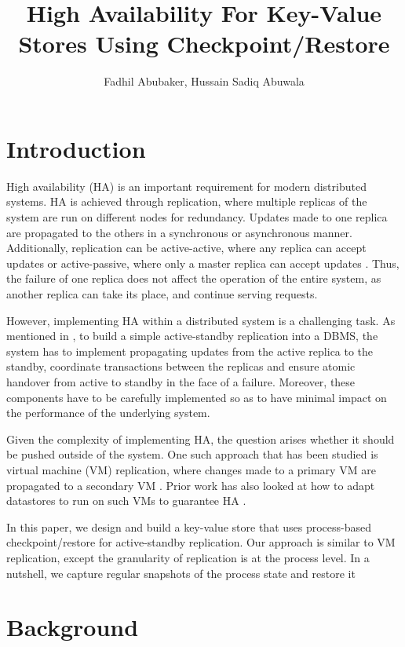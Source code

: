 \documentclass[draft]{proc}
\title{High Availability For Key-Value Stores Using Checkpoint/Restore}
\author{Fadhil Abubaker, Hussain Sadiq Abuwala}
\date{}
\begin{document}
\maketitle

\section{Introduction}

High availability (HA) is an important requirement for modern distributed
systems. HA is achieved through replication, where multiple replicas of the
system are run on different nodes for redundancy. Updates made to one replica
are propagated to the others in a synchronous or asynchronous manner.
Additionally, replication can be active-active, where any replica can accept
updates or active-passive, where only a master replica can accept updates
\cite{Dangers}. Thus, the failure of one replica does not affect the operation
of the entire system, as another replica can take its place, and continue
serving requests.

However, implementing HA within a distributed system is a challenging task. As
mentioned in \cite{RemusDB}, to build a simple active-standby replication into a
DBMS, the system has to implement propagating updates from the active replica to
the standby, coordinate transactions between the replicas and ensure atomic
handover from active to standby in the face of a failure. Moreover, these
components have to be carefully implemented so as to have minimal impact on the
performance of the underlying system.

Given the complexity of implementing HA, the question arises whether it should
be pushed outside of the system. One such approach that has been studied is
virtual machine (VM) replication, where changes made to a primary VM are
propagated to a secondary VM \cite{Hypervisor, Remus, Scales2010TheDA}. Prior
work has also looked at how to adapt datastores to run on such VMs to guarantee
HA \cite{RemusDB}.

In this paper, we design and build a key-value store that uses process-based
checkpoint/restore for active-standby replication. Our approach is similar to VM
replication, except the granularity of replication is at the process level. In a
nutshell, we capture regular snapshots of the process state and restore it

\section{Background}
\end{document}
